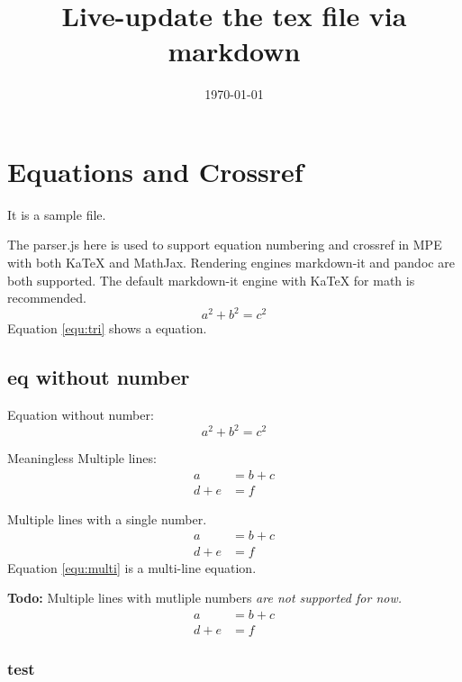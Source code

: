 \documentclass[12pt]{article}
\begin{document}
\title{Live-update the tex file via markdown}
\author{}
\date{\today}

\maketitle

\section{Equations and Crossref}\label{sec:cross}

It is a sample file.

The parser.js here is used to support equation numbering and crossref in MPE with both KaTeX and MathJax. Rendering engines markdown-it and pandoc are both supported. The default markdown-it engine with KaTeX for math is recommended.
\begin{equation}\label{equ:tri}
    a^2 + b^2 = c^2
\end{equation}
Equation \ref{equ:tri} shows a equation.

\subsection{eq without number}

Equation without number:
\begin{equation*}
    a^2 + b^2 = c^2
\end{equation*}

Meaningless Multiple lines:
\begin{align*}
    a&=b+c \\
    d+e&=f
\end{align*}

Multiple lines with a single number.
\begin{equation}\label{equ:multi}
    \begin{aligned}
        a&=b+c \\
        d+e&=f
    \end{aligned}
\end{equation}
Equation \ref{equ:multi} is a multi-line equation.

\textbf{Todo:} Multiple lines with mutliple numbers \textit{are not supported for now.}
\begin{align}
    a&=b+c \\
    d+e&=f
\end{align}

\subsubsection{test}
\end{document}
